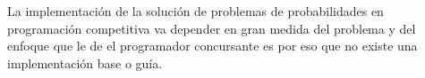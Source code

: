 La implementación de la solución de problemas de probabilidades en programación competitiva va depender en gran medida del problema y del enfoque que le de el programador concursante es por eso que no existe una implementación base o guía.